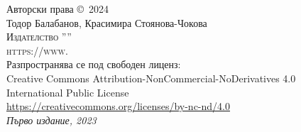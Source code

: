\noindent Авторски права \copyright\ 2024 \\

\noindent Тодор Балабанов, Красимира Стоянова-Чокова \\ 

\noindent \textsc{Издателство ''''} \\
\noindent \textsc{https://www.} \\

\noindent Разпространява се под свободен лиценз: \\ 
Creative Commons Attribution-NonCommercial-NoDerivatives 4.0 \\
International Public License \\
\url{https://creativecommons.org/licenses/by-nc-nd/4.0} \\

\noindent \textit{Първо издание, 2023}
